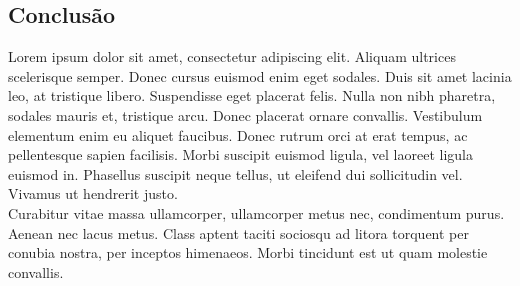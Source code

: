 \documentclass[twoside]{article}
\begin{document}
\begin{multicols}{2}
\section{Conclusão}
\indent	Lorem ipsum dolor sit amet, consectetur adipiscing elit. Aliquam ultrices scelerisque semper. Donec cursus euismod enim eget sodales. Duis sit amet lacinia leo, at tristique libero. Suspendisse eget placerat felis. Nulla non nibh pharetra, sodales mauris et, tristique arcu. Donec placerat ornare convallis. Vestibulum elementum enim eu aliquet faucibus. Donec rutrum orci at erat tempus, ac pellentesque sapien facilisis. Morbi suscipit euismod ligula, vel laoreet ligula euismod in. Phasellus suscipit neque tellus, ut eleifend dui sollicitudin vel. Vivamus ut hendrerit justo. 
\\
\indent Curabitur vitae massa ullamcorper, ullamcorper metus nec, condimentum purus. Aenean nec lacus metus. Class aptent taciti sociosqu ad litora torquent per conubia nostra, per inceptos himenaeos. Morbi tincidunt est ut quam molestie convallis.










\end{multicols}
\end{document}

